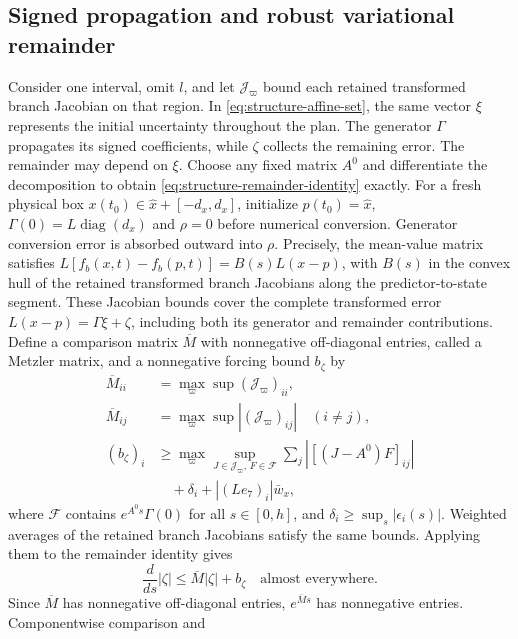 \documentclass[preprint,12pt]{elsarticle}
\begin{document}
\subsection{Signed propagation and robust variational remainder}

Consider one interval, omit $l$, and let $\mathcal J_\varpi$ bound each retained
transformed branch Jacobian on that region. In
\eqref{eq:structure-affine-set}, the same vector $\xi$ represents the
initial uncertainty throughout the plan. The generator $\Gamma$ propagates
its signed coefficients, while $\zeta$ collects the remaining error.
The remainder may depend on $\xi$. Choose any fixed matrix $A^0$ and
differentiate the decomposition to obtain
\eqref{eq:structure-remainder-identity} exactly. For a fresh physical box
$x(t_0)\in\widehat x+[-d_x,d_x]$, initialize $p(t_0)=\widehat x$,
$\Gamma(0)=L\operatorname{diag}(d_x)$ and $\rho=0$ before numerical
conversion. Generator conversion error is absorbed outward into $\rho$.
Precisely, the mean-value matrix satisfies
$L[f_b(x,t)-f_b(p,t)]=B(s)L(x-p)$, with $B(s)$ in the convex hull of
the retained transformed branch Jacobians along the predictor-to-state
segment. These Jacobian bounds cover the complete transformed error
$L(x-p)=\Gamma\xi+\zeta$, including both its generator and remainder
contributions.
Define a comparison matrix $\overline{M}$ with nonnegative off-diagonal
entries, called a Metzler matrix, and a nonnegative forcing bound
$b_\zeta$ by
\begin{equation}
 \begin{aligned}
 \overline{M}_{ii}&=\max_\varpi\sup(\mathcal J_\varpi)_{ii},\\
 \overline{M}_{ij}&=\max_\varpi\sup|(\mathcal J_\varpi)_{ij}|\quad(i\ne j),\\
 (b_\zeta)_i&\ge\max_\varpi\sup_{J\in\mathcal J_\varpi,\,F\in\mathcal F}
                  \sum_j|[(J-A^0)F]_{ij}|\\
             &\hspace{1em}+\delta_i+|(Le_7)_i|\bar w_x,
 \end{aligned}
 \label{eq:structure-metzler}
\end{equation}
where $\mathcal F$ contains $e^{A^0s}\Gamma(0)$ for all $s\in[0,h]$,
and $\delta_i\ge\sup_s|\epsilon_i(s)|$. Weighted averages of the
retained branch Jacobians satisfy the same bounds. Applying them to the
remainder identity gives
\[
 \frac{d}{ds}|\zeta|\le\overline M|\zeta|+b_\zeta
 \quad\text{almost everywhere}.
\]
Since $\overline M$ has nonnegative off-diagonal entries,
$e^{\overline M s}$ has nonnegative entries. Componentwise comparison and
\end{document}
